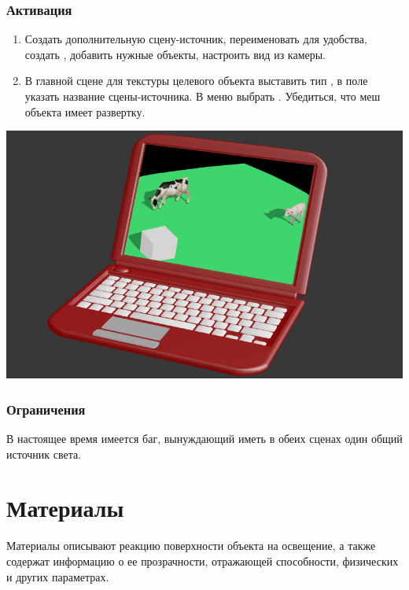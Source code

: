\documentclass[a4paper,12pt,oneside]{sphinxmanual}
\begin{document}
\subsection{Активация}
\label{textures:id24}\begin{enumerate}
\item {} 
Создать дополнительную сцену-источник, переименовать для удобства, создать , добавить нужные объекты, настроить вид из камеры.

\item {} 
В главной сцене для текстуры целевого объекта выставить тип , в поле  указать название сцены-источника. В меню  выбрать .  Убедиться, что меш объекта имеет развертку.

\end{enumerate}

{\hfill\includegraphics[width=1.000\linewidth]{render_to_texture.jpg}\hfill}


\subsection{Ограничения}
\label{textures:id25}
В настоящее время имеется баг, вынуждающий иметь в обеих сценах один общий источник света.
\label{materials:materials}

\chapter{Материалы}
\label{materials:index-0}\label{materials::doc}\label{materials:id1}
Материалы описывают реакцию поверхности объекта на освещение, а также содержат информацию о ее прозрачности, отражающей способности, физических и других параметрах.
\end{document}

